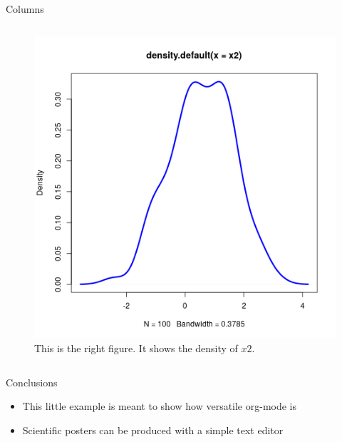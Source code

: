 \documentclass[final]{beamer}
\begin{document}
\begin{frame}[fragile,label={sec:org2358f68}]{}
\begin{columns}
\begin{column}[t]{0.45\columnwidth}
\begin{block}{Columns}
\begin{columns}
\begin{column}[T]{0.48\columnwidth}
\captionsetup{justification=justified,width=.85\linewidth}
\begin{figure}[htbp]
\centering
\includegraphics[width=.9\linewidth]{4r.png}
\caption{\label{fig:org81b5b11}
This is the right figure. It shows the density of \(x2\).}
\end{figure}
\end{column}
\end{columns}
\end{block}

\begin{block}{Conclusions}
\begin{itemize}
\item This little example is meant to show how versatile org-mode is
\item Scientific posters can be produced with a simple text editor
\end{itemize}
\end{block}
\end{column}
\end{columns}
\end{frame}
\end{document}
